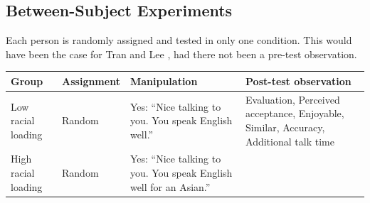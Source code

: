 \documentclass[
  english,
]{book}
\begin{document}
\hypertarget{between-subject-experiments}{%
\subsection{Between-Subject Experiments}\label{between-subject-experiments}}

Each person is randomly assigned and tested in only one condition. This would have been the case for Tran and Lee \citeyearpar{tran_you_2014}, had there not been a pre-test observation.

\begin{longtable}[]{@{}llll@{}}
\toprule
\begin{minipage}[b]{0.14\columnwidth}\raggedright
Group\strut
\end{minipage} & \begin{minipage}[b]{0.24\columnwidth}\raggedright
Assignment\strut
\end{minipage} & \begin{minipage}[b]{0.20\columnwidth}\raggedright
Manipulation\strut
\end{minipage} & \begin{minipage}[b]{0.30\columnwidth}\raggedright
Post-test observation\strut
\end{minipage}\tabularnewline
\midrule
\endhead
\begin{minipage}[t]{0.14\columnwidth}\raggedright
Low racial loading\strut
\end{minipage} & \begin{minipage}[t]{0.24\columnwidth}\raggedright
Random\strut
\end{minipage} & \begin{minipage}[t]{0.20\columnwidth}\raggedright
Yes: ``Nice talking to you. You speak English well.''\strut
\end{minipage} & \begin{minipage}[t]{0.30\columnwidth}\raggedright
Evaluation, Perceived acceptance, Enjoyable, Similar, Accuracy, Additional talk time\strut
\end{minipage}\tabularnewline
\begin{minipage}[t]{0.14\columnwidth}\raggedright
High racial loading\strut
\end{minipage} & \begin{minipage}[t]{0.24\columnwidth}\raggedright
Random\strut
\end{minipage} & \begin{minipage}[t]{0.20\columnwidth}\raggedright
Yes: ``Nice talking to you. You speak English well for an Asian.''\strut

\end{minipage}
\end{longtable}
\end{document}
